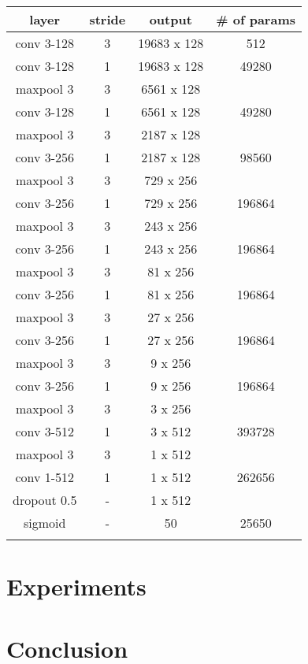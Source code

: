 \begin{center}
	\begin{tabular}{ c c c c}

		layer & stride & output & \# of params\\
		\hline
		\hline
		conv 3-128 & 3 & 19683 x 128 & 512 \\
		\hline
		conv 3-128 & 1 & 19683 x 128 & 49280 \\
		maxpool 3 & 3 & 6561 x 128 & \\
		\hline
		conv 3-128 & 1 & 6561 x 128 & 49280 \\
		maxpool 3 & 3 & 2187 x 128 & \\
		\hline
		conv 3-256 & 1 & 2187 x 128 & 98560 \\
		maxpool 3 & 3 & 729 x 256 & \\
		\hline
		conv 3-256 & 1 & 729 x 256 & 196864 \\
		maxpool 3 & 3 & 243 x 256 & \\
		\hline
		conv 3-256 & 1 & 243 x 256 & 196864 \\
		maxpool 3 & 3 & 81 x 256 & \\
		\hline
		conv 3-256 & 1 & 81 x 256 & 196864 \\
		maxpool 3 & 3 & 27 x 256 & \\
		\hline
		conv 3-256 & 1 & 27 x 256 & 196864 \\
		maxpool 3 & 3 & 9 x 256 & \\
		\hline
		conv 3-256 & 1 & 9 x 256 & 196864 \\
		maxpool 3 & 3 & 3 x 256 & \\
		\hline
		conv 3-512 & 1 & 3 x 512 & 393728 \\
		maxpool 3 & 3 & 1 x 512 & \\
		\hline
		conv 1-512 & 1 & 1 x 512 & 262656 \\
		dropout 0.5 & - & 1 x 512 & \\
		\hline
		sigmoid & - & 50 & 25650 \\
		
		 & & & \\	
	\end{tabular}
	\label{tab:sample-dcnn_original-model}
\end{center}



\section{Experiments}
\label{sec:experiments}

\section{Conclusion}
\label{sec:conclusion}